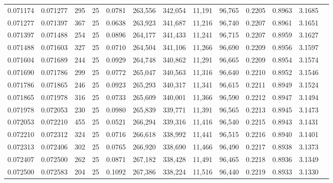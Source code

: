 \begin{tabular}{rrrrrrrrrrrrr}
0.071174 & 0.071277 &   295 &  25 &                                     0.0781 & 263,556 & 342,054 &  11,191 &  96,765 & 0.2205 & 0.8963 & 3.1685 \\
0.071277 & 0.071397 &   367 &  25 &                                     0.0638 & 263,923 & 341,687 &  11,216 &  96,740 & 0.2207 & 0.8961 & 3.1651 \\
0.071397 & 0.071488 &   254 &  25 &                                     0.0896 & 264,177 & 341,433 &  11,241 &  96,715 & 0.2207 & 0.8959 & 3.1627 \\
0.071488 & 0.071603 &   327 &  25 &                                     0.0710 & 264,504 & 341,106 &  11,266 &  96,690 & 0.2209 & 0.8956 & 3.1597 \\
0.071604 & 0.071689 &   244 &  25 &                                     0.0929 & 264,748 & 340,862 &  11,291 &  96,665 & 0.2209 & 0.8954 & 3.1574 \\
0.071690 & 0.071786 &   299 &  25 &                                     0.0772 & 265,047 & 340,563 &  11,316 &  96,640 & 0.2210 & 0.8952 & 3.1546 \\
0.071786 & 0.071865 &   246 &  25 &                                     0.0923 & 265,293 & 340,317 &  11,341 &  96,615 & 0.2211 & 0.8949 & 3.1524 \\
0.071865 & 0.071978 &   316 &  25 &                                     0.0733 & 265,609 & 340,001 &  11,366 &  96,590 & 0.2212 & 0.8947 & 3.1494 \\
0.071978 & 0.072053 &   230 &  25 &                                     0.0980 & 265,839 & 339,771 &  11,391 &  96,565 & 0.2213 & 0.8945 & 3.1473 \\
0.072053 & 0.072210 &   455 &  25 &                                     0.0521 & 266,294 & 339,316 &  11,416 &  96,540 & 0.2215 & 0.8943 & 3.1431 \\
0.072210 & 0.072312 &   324 &  25 &                                     0.0716 & 266,618 & 338,992 &  11,441 &  96,515 & 0.2216 & 0.8940 & 3.1401 \\
0.072313 & 0.072406 &   302 &  25 &                                     0.0765 & 266,920 & 338,690 &  11,466 &  96,490 & 0.2217 & 0.8938 & 3.1373 \\
0.072407 & 0.072500 &   262 &  25 &                                     0.0871 & 267,182 & 338,428 &  11,491 &  96,465 & 0.2218 & 0.8936 & 3.1349 \\
0.072500 & 0.072583 &   204 &  25 &                                     0.1092 & 267,386 & 338,224 &  11,516 &  96,440 & 0.2219 & 0.8933 & 3.1330 \\

\end{tabular}
